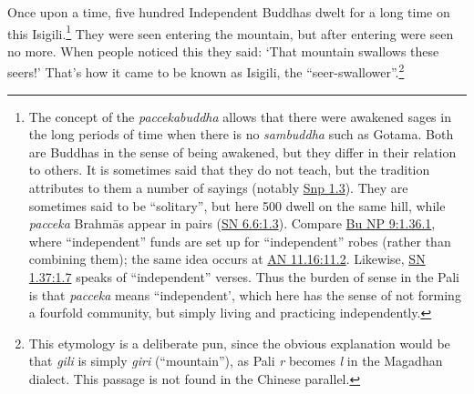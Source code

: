 \documentclass[12pt,openany]{book}%
\begin{document}
Once upon a time, five hundred Independent Buddhas dwelt for a long time on this Isigili.\footnote{The concept of the \textit{paccekabuddha} allows that there were awakened sages in the long periods of time when there is no \textit{sambuddha} such as Gotama. Both are Buddhas in the sense of being awakened, but they differ in their relation to others. It is sometimes said that they do not teach, but the tradition attributes to them a number of sayings (notably \href{https://suttacentral.net/snp1.3/en/sujato}{Snp 1.3}). They are sometimes said to be “solitary”, but here 500 dwell on the same hill, while \textit{pacceka} \textsanskrit{Brahmās} appear in pairs (\href{https://suttacentral.net/sn6.6/en/sujato\#1.3}{SN 6.6:1.3}). Compare \href{https://suttacentral.net/pli-tv-bu-vb-np9/en/sujato\#1.36.1}{Bu NP 9:1.36.1}, where “independent” funds are set up for “independent” robes (rather than combining them); the same idea occurs at \href{https://suttacentral.net/an11.16/en/sujato\#11.2}{AN 11.16:11.2}. Likewise, \href{https://suttacentral.net/sn1.37/en/sujato\#1.7}{SN 1.37:1.7} speaks of “independent” verses. Thus the burden of sense in the Pali is that \textit{pacceka} means “independent’, which here has the sense of not forming a fourfold community, but simply living and practicing independently. } They were seen entering the mountain, but after entering were seen no more. When people noticed this they said: ‘That mountain swallows these seers!’ That’s how it came to be known as Isigili, the “seer-swallower”.\footnote{This etymology is a deliberate pun, since the obvious explanation would be that \textit{gili} is simply \textit{giri} (“mountain”), as Pali \emph{r} becomes \emph{l} in the Magadhan dialect. This passage is not found in the Chinese parallel. } 
\end{document}
